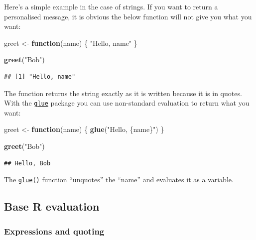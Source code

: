 \documentclass[]{book}
\newenvironment{Shaded}{\begin{snugshade}}{\end{snugshade}}
\newcommand{\ControlFlowTok}[1]{\textcolor[rgb]{0.13,0.29,0.53}{\textbf{#1}}}
\newcommand{\KeywordTok}[1]{\textcolor[rgb]{0.13,0.29,0.53}{\textbf{#1}}}
\newcommand{\NormalTok}[1]{#1}
\newcommand{\StringTok}[1]{\textcolor[rgb]{0.31,0.60,0.02}{#1}}
\begin{document}
Here's a simple example in the case of strings. If you want to return a personalised
message, it is obvious the below function will not give you what you want:

\begin{Shaded}
\begin{Highlighting}[]
\NormalTok{greet <-}\StringTok{ }\ControlFlowTok{function}\NormalTok{(name) \{}
  \StringTok{"Hello, name"}
\NormalTok{\}}

\KeywordTok{greet}\NormalTok{(}\StringTok{"Bob"}\NormalTok{)}
\end{Highlighting}
\end{Shaded}

\begin{verbatim}
## [1] "Hello, name"
\end{verbatim}

The function returns the string exactly as it is written because it is in quotes. With the
\href{https://www.rdocumentation.org/packages/glue}{\texttt{glue}} package you can use non-standard
evaluation to return what you want:

\begin{Shaded}
\begin{Highlighting}[]
\NormalTok{greet <-}\StringTok{ }\ControlFlowTok{function}\NormalTok{(name) \{}
  \KeywordTok{glue}\NormalTok{(}\StringTok{"Hello, \{name\}"}\NormalTok{)}
\NormalTok{\}}

\KeywordTok{greet}\NormalTok{(}\StringTok{"Bob"}\NormalTok{)}
\end{Highlighting}
\end{Shaded}

\begin{verbatim}
## Hello, Bob
\end{verbatim}

The \href{https://www.rdocumentation.org/packages/glue/topics/glue}{\texttt{glue()}} function
``unquotes'' the ``name'' and evaluates it as a variable.

\hypertarget{base-r-evaluation}{%
\subsection{Base R evaluation}\label{base-r-evaluation}}

\hypertarget{expressions-and-quoting}{%
\subsubsection{Expressions and quoting}\label{expressions-and-quoting}}
\end{document}
